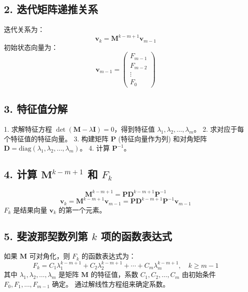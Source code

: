 \documentclass{article}
\begin{document}
\subsection*{2. 迭代矩阵递推关系}

迭代关系为：
$$ \mathbf{v}_k = \mathbf{M}^{k-m+1} \mathbf{v}_{m-1} $$
初始状态向量为：
$$ \mathbf{v}_{m-1} = \begin{pmatrix} F_{m-1} \\ F_{m-2} \\ \vdots \\ F_0 \end{pmatrix} $$

\subsection*{3. 特征值分解}

1.  求解特征方程 $\det(\mathbf{M} - \lambda \mathbf{I}) = 0$，得到特征值 $\lambda_1, \lambda_2, \ldots, \lambda_m$。
2.  求对应于每个特征值的特征向量。
3.  构建矩阵 $\mathbf{P}$ (特征向量作为列) 和对角矩阵 $\mathbf{D} = \text{diag}(\lambda_1, \lambda_2, \ldots, \lambda_m)$。
4.  计算 $\mathbf{P}^{-1}$。

\subsection*{4. 计算 $\mathbf{M}^{k-m+1}$ 和 $F_k$}

$$ \mathbf{M}^{k-m+1} = \mathbf{P} \mathbf{D}^{k-m+1} \mathbf{P}^{-1} $$
$$ \mathbf{v}_k = \mathbf{M}^{k-m+1} \mathbf{v}_{m-1} = \mathbf{P} \mathbf{D}^{k-m+1} \mathbf{P}^{-1} \mathbf{v}_{m-1} $$
$F_k$ 是结果向量 $\mathbf{v}_k$ 的第一个元素。

\subsection*{5. 斐波那契数列第 $k$ 项的函数表达式}

如果 $\mathbf{M}$ 可对角化，则 $F_k$ 的函数表达式为：
$$ F_k = C_1 \lambda_1^{k-m+1} + C_2 \lambda_2^{k-m+1} + \cdots + C_m \lambda_m^{k-m+1}, \quad k \ge m-1 $$
其中 $\lambda_1, \lambda_2, \ldots, \lambda_m$ 是矩阵 $\mathbf{M}$ 的特征值，系数 $C_1, C_2, \ldots, C_m$ 由初始条件 $F_0, F_1, \ldots, F_{m-1}$ 确定。  通过解线性方程组来确定系数。
\end{document}

